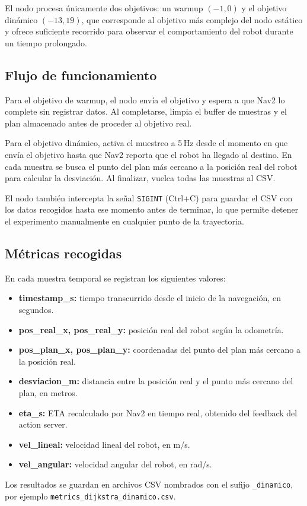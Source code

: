 El nodo procesa únicamente dos objetivos: un warmup $(-1, 0)$ y el objetivo dinámico $(-13, 19)$, que corresponde al objetivo más complejo del nodo estático y ofrece suficiente recorrido para observar el comportamiento del robot durante un tiempo prolongado.

\subsection{Flujo de funcionamiento}

Para el objetivo de warmup, el nodo envía el objetivo y espera a que Nav2 lo complete sin registrar datos. Al completarse, limpia el buffer de muestras y el plan almacenado antes de proceder al objetivo real.

Para el objetivo dinámico, activa el muestreo a 5\,Hz desde el momento en que envía el objetivo hasta que Nav2 reporta que el robot ha llegado al destino. En cada muestra se busca el punto del plan más cercano a la posición real del robot para calcular la desviación. Al finalizar, vuelca todas las muestras al CSV.

El nodo también intercepta la señal \texttt{SIGINT} (Ctrl+C) para guardar el CSV con los datos recogidos hasta ese momento antes de terminar, lo que permite detener el experimento manualmente en cualquier punto de la trayectoria.

\subsection{Métricas recogidas}

En cada muestra temporal se registran los siguientes valores:

\begin{itemize}
    \item \textbf{timestamp\_s:} tiempo transcurrido desde el inicio de la navegación, en segundos.
    \item \textbf{pos\_real\_x, pos\_real\_y:} posición real del robot según la odometría.
    \item \textbf{pos\_plan\_x, pos\_plan\_y:} coordenadas del punto del plan más cercano a la posición real.
    \item \textbf{desviacion\_m:} distancia entre la posición real y el punto más cercano del plan, en metros.
    \item \textbf{eta\_s:} ETA recalculado por Nav2 en tiempo real, obtenido del feedback del action server.
    \item \textbf{vel\_lineal:} velocidad lineal del robot, en m/s.
    \item \textbf{vel\_angular:} velocidad angular del robot, en rad/s.
\end{itemize}

Los resultados se guardan en archivos CSV nombrados con el sufijo \texttt{\_dinamico}, por ejemplo \texttt{metrics\_dijkstra\_dinamico.csv}.
